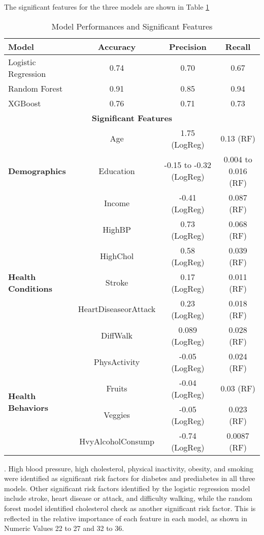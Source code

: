 \documentclass[12pt]{article}
\begin{document}
The significant features for the three models are shown in Table \ref{tab:model performances}\begin{table}[!htb]
\centering
\caption{Model Performances and Significant Features}
\label{tab:model performances}
\begin{tabular}{@{}lccc@{}}
\toprule
\textbf{Model} & \textbf{Accuracy} & \textbf{Precision} & \textbf{Recall} \\ \midrule
Logistic Regression & 0.74 & 0.70 & 0.67 \\
Random Forest       & 0.91 & 0.85 & 0.94 \\
XGBoost             & 0.76 & 0.71 & 0.73 \\ \midrule
\multicolumn{4}{c}{\textbf{Significant Features}} \\ \midrule
\multirow{3}{*}{\textbf{Demographics}} 
& Age            & 1.75 (LogReg)    & 0.13 (RF) \\
& Education      & -0.15 to -0.32 (LogReg) & 0.004 to 0.016 (RF) \\
& Income         & -0.41 (LogReg)  & 0.087 (RF) \\ \midrule
\multirow{5}{*}{\textbf{Health Conditions}} 
& HighBP         & 0.73 (LogReg)  & 0.068 (RF) \\
& HighChol       & 0.58 (LogReg)  & 0.039 (RF) \\
& Stroke         & 0.17 (LogReg)  & 0.011 (RF) \\
& HeartDiseaseorAttack & 0.23 (LogReg)  & 0.018 (RF) \\
& DiffWalk       & 0.089 (LogReg) & 0.028 (RF) \\ \midrule
\multirow{4}{*}{\textbf{Health Behaviors}} 
& PhysActivity   & -0.05 (LogReg) & 0.024 (RF) \\
& Fruits         & -0.04 (LogReg) & 0.03 (RF) \\
& Veggies        & -0.05 (LogReg) & 0.023 (RF) \\
& HvyAlcoholConsump & -0.74 (LogReg)  & 0.0087 (RF) \\ \bottomrule
\end{tabular}
\end{table}. High blood pressure, high cholesterol, physical inactivity, obesity, and smoking were identified as significant risk factors for diabetes and prediabetes in all three models. Other significant risk factors identified by the logistic regression model include stroke, heart disease or attack, and difficulty walking, while the random forest model identified cholesterol check as another significant risk factor. This is reflected in the relative importance of each feature in each model, as shown in Numeric Values 22 to 27 and 32 to 36.
\end{document}
